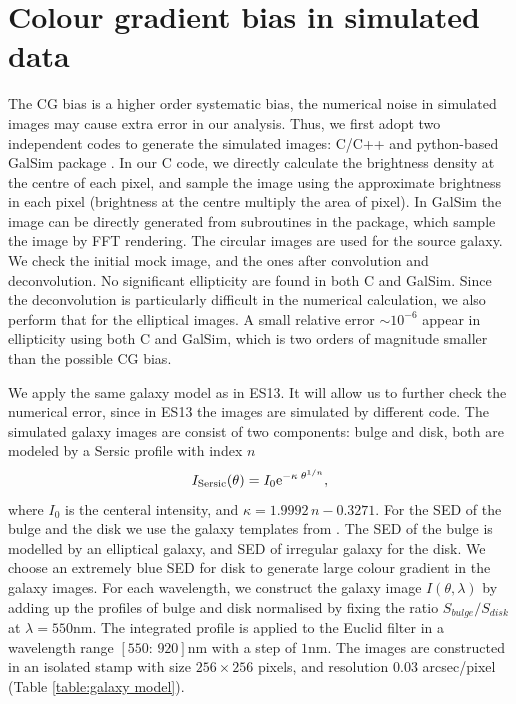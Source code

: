\documentclass[useAMS,usenatbib]{mn2e}
\newcommand{\be}{\begin{equation}}
\newcommand{\ee}{\end{equation}}
\begin{document}
\section{Colour gradient bias in simulated data}

The CG bias is a higher order systematic bias, the numerical noise in
simulated images may cause extra error in our analysis. Thus, we first
adopt two independent codes to generate the simulated images: C/C++
and python-based GalSim package
\citep{2015A&amp;C....10..121R}. In our C code, we directly calculate
the brightness density at the centre of each pixel, and sample the
image using the approximate brightness in each pixel (brightness at
the centre multiply the area of pixel). In GalSim the image can be
directly generated from subroutines in the package, which sample the
image by FFT rendering.
%
The circular images are used for the source galaxy. We check the
initial mock image, and the ones after convolution and
deconvolution. No significant ellipticity are found in both C and
GalSim.  Since the deconvolution is particularly difficult in the
numerical calculation, we also perform that for the elliptical
images. A small relative error $\sim10^{-6}$ appear in ellipticity
using both C and GalSim, which is two orders of magnitude smaller than
the possible CG bias.

We apply the same galaxy model as in ES13. It will allow us to further
check the numerical error, since in ES13 the images are simulated by
different code.  The simulated galaxy images are consist of two
components: bulge and disk, both are modeled by a Sersic profile with index $n$
%
\be
I_{\rm Sersic}(\theta) = I_0 {\rm e}^{-\kappa\; \theta^{1/n}},
\ee
%
where $I_0$ is the centeral intensity, and $\kappa=1.9992\,n -
0.3271$.  For the SED of the bulge and the disk we use the galaxy
templates from \citet{1980ApJS...43..393C}. The SED of the bulge is
modelled by an elliptical galaxy, and SED of irregular galaxy for the
disk. We choose an extremely blue SED for disk to generate large
colour gradient in the galaxy images. For each wavelength, we
construct the galaxy image $I(\theta,\lambda)$ by adding up the
profiles of bulge and disk normalised by fixing the ratio
$S_{bulge}/S_{disk}$ at $\lambda=550$nm. The integrated profile is
applied to the Euclid filter in a wavelength range $[550:\,920]$nm
with a step of $1$nm. The images are constructed in an isolated stamp
with size $256\times256$ pixels, and resolution $0.03$ arcsec/pixel
(Table \ref{table:galaxy model}).
\end{document}
